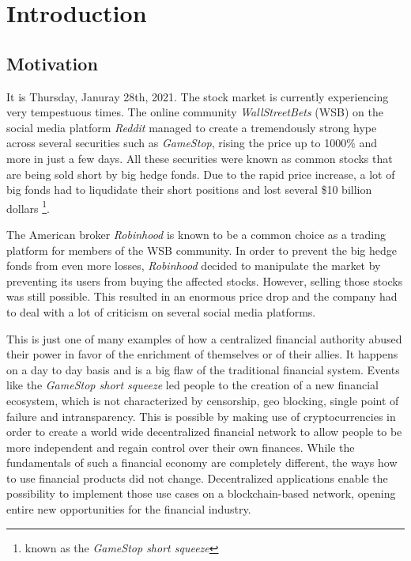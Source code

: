 \chapter{Introduction}
\label{cha:Introduction}

\section{Motivation}
It is Thursday, Januray 28th, 2021. The stock market is currently experiencing very tempestuous times. The online community \textit{WallStreetBets} (WSB)
on the social media platform \textit{Reddit} managed to create a tremendously strong hype across several securities such as \textit{GameStop}, rising
the price up to 1000\% and more in just a few days. All these securities were known as common stocks that are being sold short by big hedge fonds.
Due to the rapid price increase, a lot of big fonds had to liqudidate their short positions and lost several \$10 billion dollars \footnote{known as the \textit{GameStop short squeeze}}.

The American
broker \textit{Robinhood} is known to be a common choice as a trading platform for members of the WSB community. In order to prevent the big hedge
fonds from even more losses, \textit{Robinhood} decided to manipulate the market by preventing its users from buying the affected stocks. However, selling those
stocks was still possible. This resulted in an enormous price drop and the company had to deal with a lot of criticism on several social media platforms.

This is just one of many examples of how a centralized financial authority abused their power in favor of the enrichment of themselves or of their allies.
It happens on a day to day basis and is a big flaw of the traditional financial system. Events like the \textit{GameStop short squeeze} led people to
the creation of a new financial ecosystem, which is not characterized by censorship, geo blocking, single point of failure and intransparency. This is
possible by making use of cryptocurrencies in order to create a world wide decentralized financial network to allow people to be more independent and
regain control over their own finances. While the fundamentals of such a financial economy are completely different, the ways how to use financial
products did not change. Decentralized applications enable the possibility to implement those use cases on a blockchain-based network, opening entire
new opportunities for the financial industry.

